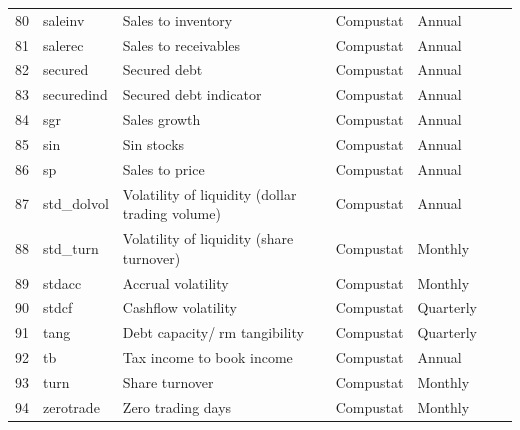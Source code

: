 \documentclass[a4paper, table]{article}
\begin{document}
\begin{landscape}
\begin{center}
\begin{longtable}{llllllll}
			80 & saleinv\footnotemark[\value{footnote}] & Sales to inventory & 
				\cite{ou_financial_1989} & Compustat & Annual \\
			81 & salerec & Sales to receivables & 
				\cite{ou_financial_1989} & Compustat & Annual \\
			82 & secured\footnotemark[\value{footnote}] & Secured debt & 
				\cite{valta_strategic_2016} & Compustat & Annual \\
			83 & securedind & Secured debt indicator & 
				\cite{valta_strategic_2016} & Compustat & Annual \\
			84 & sgr\footnotemark[\value{footnote}] & Sales growth & 
				\cite{barbee_jr_salesprice_1996} & Compustat & Annual \\
			85 & sin & Sin stocks & 
				\cite{hong_price_2009} & Compustat & Annual \\
			86 & sp & Sales to price & 
				\cite{barbee_jr_salesprice_1996} & Compustat & Annual \\
			87 & std\_dolvol & Volatility of liquidity (dollar trading volume) & 
				\cite{chordia_trading_2001} & Compustat & Annual \\
			88 & std\_turn & Volatility of liquidity (share turnover) & 
				\cite{chordia_trading_2001} & Compustat & Monthly \\
			89 & stdacc\footnotemark[\value{footnote}] & Accrual volatility & 
				\cite{bandyopadhyay_accrual_2010} & Compustat & Monthly \\
			90 & stdcf\footnotemark[\value{footnote}] & Cashflow volatility & 
				\cite{huang_cross_2009} & Compustat & Quarterly \\
			91 & tang & Debt capacity/rm tangibility & 
				\cite{almeida_financial_2007} & Compustat & Quarterly \\
			92 & tb\footnotemark[\value{footnote}] & Tax income to book income & 
				\cite{lev_market-based_1982} & Compustat & Annual \\
			93 & turn & Share turnover & 
				\cite{datar_liquidity_1998} & Compustat & Monthly \\
			94 & zerotrade & Zero trading days & 
				\cite{liu_liquidity-augmented_2006} & Compustat & Monthly \\	
		\end{longtable}
	\end{center}
\end{landscape}

\newpage
\end{document}

